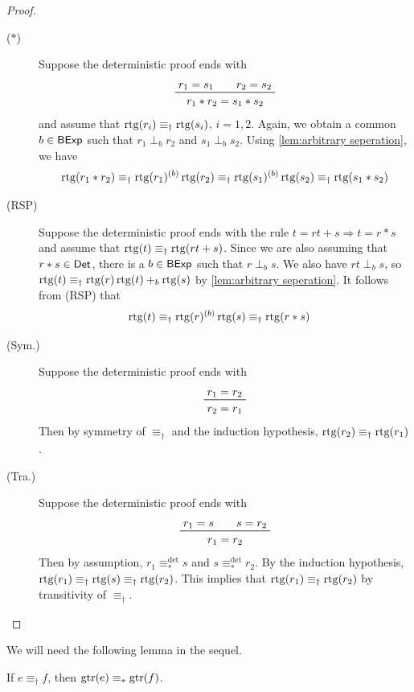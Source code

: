 \documentclass[orivec,envcountsect,envcountsame]{llncs}
\begin{document}
\begin{proof}
\begin{description}
		\item[(\(*\))] Suppose the deterministic proof ends with
		\[
		\prftree{r_1 = s_1 \qquad r_2 = s_2}{r_1 * r_2 = s_1 * s_2}
		\]
		and assume that \(\operatorname{rtg}(r_i) \equiv_\dagger \operatorname{rtg}(s_i)\), \(i = 1,2\).
		Again, we obtain a common $b \in \mathsf{BExp}$ such that \(r_1 \perp_b r_2\) and \(s_1 \perp_b s_2\).
		Using \cref{lem:arbitrary seperation}, we have
		\begin{align*}
			\operatorname{rtg}(r_1 * r_2)
			\equiv_\dagger \operatorname{rtg}(r_1){\mathbin{^{(b)}}} \operatorname{rtg}(r_2)
			\equiv_\dagger \operatorname{rtg}(s_1){\mathbin{^{(b)}}} \operatorname{rtg}(s_2)
			\equiv_\dagger \operatorname{rtg}(s_1 * s_2)
		\end{align*}

		\item[(\textsf{RSP})] Suppose the deterministic proof ends with the rule
		\(
		t = rt + s \Rightarrow t = r * s
		\)
		and assume that \(\operatorname{rtg}(t) \equiv_\dagger \operatorname{rtg}(rt + s)\).
		Since we are also assuming that \(r*s \in \mathsf{Det}\), there is a \(b \in \mathsf{BExp}\) such that \(r \perp_b s\).
		We also have \(rt \perp_b s\), so
		\(
		\operatorname{rtg}(t) \equiv_\dagger \operatorname{rtg}(r)\operatorname{rtg}(t) +_b \operatorname{rtg}(s)
		\) by \cref{lem:arbitrary seperation}.
		It follows from (\textsf{RSP}) that
		\begin{align*}
			\operatorname{rtg}(t) &\equiv_\dagger \operatorname{rtg}(r){\mathbin{^{(b)}}}\operatorname{rtg}(s) \equiv_\dagger \operatorname{rtg}(r * s)
		\end{align*}

		\item[(Sym.)] Suppose the deterministic proof ends with
		\[
		\prftree{r_1 = r_2}{r_2 = r_1}
		\]
		Then by symmetry of \(\equiv_\dagger\) and the induction hypothesis, \(\operatorname{rtg}(r_2) \equiv_\dagger \operatorname{rtg}(r_1)\).

		\item[(Tra.)] Suppose the deterministic proof ends with
		\[
		\prftree{r_1 = s \qquad s = r_2}{r_1 = r_2}
		\]
		Then by assumption, \(r_1 \equiv_*^{\det} s\) and \(s \equiv_*^{\det} r_2\).
		By the induction hypothesis, \(\operatorname{rtg}(r_1) \equiv_\dagger \operatorname{rtg}(s) \equiv_\dagger \operatorname{rtg}(r_2)\).
		This implies that \(\operatorname{rtg}(r_1) \equiv_\dagger \operatorname{rtg}(r_2)\) by transitivity of \(\equiv_\dagger\).
	\end{description}
\end{proof}



\noindent
We will need the following lemma in the sequel.

\begin{lemma}\label{lem:gkat proofs to regex}
	If \(e \equiv_\dagger f\), then \(\operatorname{gtr}(e) \equiv_* \operatorname{gtr}(f)\).
\end{lemma}
\end{document}

